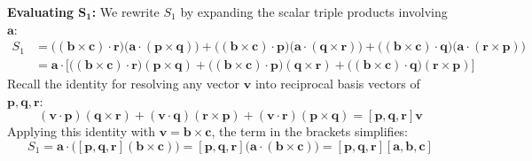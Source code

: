 \documentclass[12pt,a4paper]{article}
\begin{document}
\begin{enumerate}
\begin{tcolorbox}[enhanced,breakable,ansbox,colback=cD!4,colframe=cD,boxrule=0.8pt,arc=5pt,title={\textbf{Answer}},fonttitle=\bfseries\color{white},colbacktitle=cD]
\textbf{Evaluating $\boldsymbol{S_1}$:}
We rewrite $S_1$ by expanding the scalar triple products involving $\mathbf{a}$:
\begin{align*}
    S_1 &= \big( (\mathbf{b}\times\mathbf{c})\cdot\mathbf{r} \big) \big( \mathbf{a}\cdot(\mathbf{p}\times\mathbf{q}) \big) + \big( (\mathbf{b}\times\mathbf{c})\cdot\mathbf{p} \big) \big( \mathbf{a}\cdot(\mathbf{q}\times\mathbf{r}) \big) + \big( (\mathbf{b}\times\mathbf{c})\cdot\mathbf{q} \big) \big( \mathbf{a}\cdot(\mathbf{r}\times\mathbf{p}) \big) \\
    &= \mathbf{a} \cdot \Big[ \big( (\mathbf{b}\times\mathbf{c})\cdot\mathbf{r} \big)(\mathbf{p}\times\mathbf{q}) + \big( (\mathbf{b}\times\mathbf{c})\cdot\mathbf{p} \big)(\mathbf{q}\times\mathbf{r}) + \big( (\mathbf{b}\times\mathbf{c})\cdot\mathbf{q} \big)(\mathbf{r}\times\mathbf{p}) \Big]
\end{align*}
Recall the identity for resolving any vector $\mathbf{v}$ into reciprocal basis vectors of $\mathbf{p}, \mathbf{q}, \mathbf{r}$:
\[ (\mathbf{v}\cdot\mathbf{p})(\mathbf{q}\times\mathbf{r}) + (\mathbf{v}\cdot\mathbf{q})(\mathbf{r}\times\mathbf{p}) + (\mathbf{v}\cdot\mathbf{r})(\mathbf{p}\times\mathbf{q}) = [\mathbf{p}, \mathbf{q}, \mathbf{r}]\mathbf{v} \]
Applying this identity with $\mathbf{v} = \mathbf{b}\times\mathbf{c}$, the term in the brackets simplifies:
\[ S_1 = \mathbf{a} \cdot \big( [\mathbf{p}, \mathbf{q}, \mathbf{r}] (\mathbf{b}\times\mathbf{c}) \big) = [\mathbf{p}, \mathbf{q}, \mathbf{r}] \big( \mathbf{a} \cdot (\mathbf{b}\times\mathbf{c}) \big) = [\mathbf{p}, \mathbf{q}, \mathbf{r}][\mathbf{a}, \mathbf{b}, \mathbf{c}] \]


\end{tcolorbox}
\end{enumerate}
\end{document}
